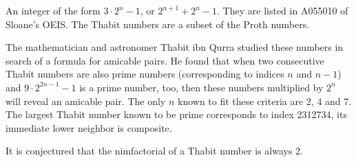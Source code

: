 \documentclass[12pt]{article}
\begin{document}
An integer of the form $3 \cdot 2^n - 1$, or $2^{n + 1} + 2^n - 1$. They are listed in A055010 of Sloane's OEIS. The Thabit numbers are a subset of the Proth numbers.

The mathematician and astronomer Thabit ibn Qurra studied these numbers in search of a formula for amicable pairs. He found that when two consecutive Thabit numbers are  also prime numbers (corresponding to indices $n$ and $n - 1$) and $9 \cdot 2^{2n - 1} - 1$ is a prime number, too, then these numbers multiplied by $2^n$ will reveal an amicable pair. The only $n$ known to fit these criteria are 2, 4 and 7. The largest Thabit number known to be prime corresponds to index 2312734, its immediate lower neighbor is composite.

It is conjectured that the nimfactorial of a Thabit number is always 2.
\end{document}
